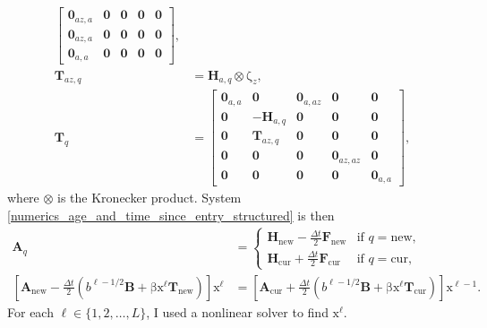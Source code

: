 \documentclass[USenglish]{article}
\renewcommand{\vec}[1]{\boldsymbol{\mathrm{#1}}}
\newcommand{\mat}[1]{\mathbf{#1}}
\begin{document}
\begin{subequations}
\begin{align}
\begin{bmatrix}
      \mat{0}_{az,a} & \mat{0} & \mat{0} & \mat{0} & \mat{0} \\
      \mat{0}_{az,a} & \mat{0} & \mat{0} & \mat{0} & \mat{0} \\
      \mat{0}_{a,a} & \mat{0} & \mat{0} & \mat{0} & \mat{0}
    \end{bmatrix},
    \\
    \mat{T}_{az,q} &=
    \mat{H}_{a, q} \otimes \vec{\zeta}_z,
    \\
    \mat{T}_q &=
    \begin{bmatrix}
      \mat{0}_{a,a} & \mat{0} & \mat{0}_{a,az} & \mat{0} & \mat{0} \\
      \mat{0} & - \mat{H}_{a, q} & \mat{0} & \mat{0} & \mat{0} \\
      \mat{0} & \mat{T}_{az, q} & \mat{0} & \mat{0} & \mat{0} \\
      \mat{0} & \mat{0} & \mat{0} & \mat{0}_{az,az} & \mat{0} \\
      \mat{0} & \mat{0} & \mat{0} & \mat{0} & \mat{0}_{a,a}
    \end{bmatrix},
  \end{align}
\end{subequations}
where $\otimes$ is the Kronecker product.
System \eqref{numerics_age_and_time_since_entry_structured} is then
\begin{subequations}
  \label{step_age_and_time_since_entry_structured}
  \begin{align}
    \mat{A}_q &=
    \begin{cases}
      \mat{H}_{\mathrm{new}} - \frac{\Delta t}{2} \mat{F}_{\mathrm{new}}
      & \text{if $q = \mathrm{new}$},
      \\
      \mat{H}_{\mathrm{cur}} + \frac{\Delta t}{2} \mat{F}_{\mathrm{cur}}
      & \text{if $q = \mathrm{cur}$},
    \end{cases}
    \\
    \left[
      \mat{A}_{\mathrm{new}}
      - \frac{\Delta t}{2} \left(
        b^{\ell - 1 / 2} \mat{B}
        + \vec{\beta} \vec{x}^{\ell} \mat{T}_{\mathrm{new}}
      \right)
    \right]
    \vec{x}^{\ell} &=
    \left[
      \mat{A}_{\mathrm{cur}}
      + \frac{\Delta t}{2} \left(
        b^{\ell - 1 / 2} \mat{B}
        + \vec{\beta} \vec{x}^{\ell} \mat{T}_{\mathrm{cur}}
      \right)
    \right]
    \vec{x}^{\ell - 1}.
  \end{align}
\end{subequations}
For each $\ell \in \{1, 2, \ldots, L\}$, I used a nonlinear
solver to find $\vec{x}^{\ell}$.
\end{document}
